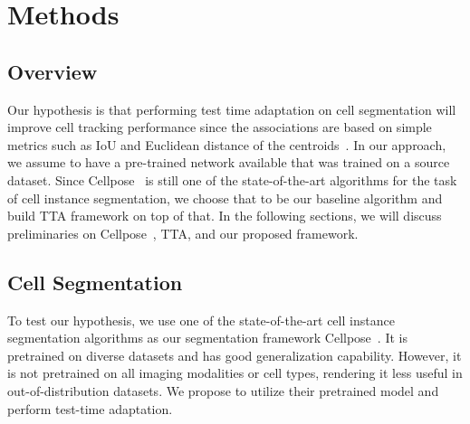 \section{Methods}

\subsection{Overview}

Our hypothesis is that performing test time adaptation on cell segmentation will improve cell tracking performance since the associations are based on simple metrics such as IoU and Euclidean distance of the centroids~\cite{bragantini2024ultrack}. In our approach, we assume to have a pre-trained network available that was trained on a source dataset. Since Cellpose~\cite{stringer2021cellpose} is still one of the state-of-the-art algorithms for the task of cell instance segmentation, we choose that to be our baseline algorithm and build TTA framework on top of that. In the following sections, we will discuss preliminaries on Cellpose~\cite{stringer2021cellpose}, TTA, and our proposed framework. 



\subsection{Cell Segmentation}

To test our hypothesis, we use one of the state-of-the-art cell instance segmentation algorithms as our segmentation framework Cellpose~\cite{stringer2021cellpose}. It is pretrained on diverse datasets and has good generalization capability. However, it is not pretrained on all imaging modalities or cell types, rendering it less useful in out-of-distribution datasets. We propose to utilize their pretrained model and perform test-time adaptation. 

